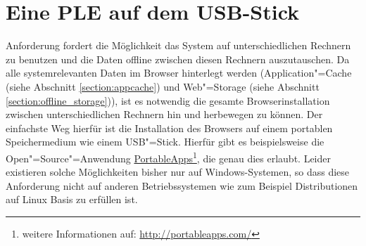\section{Eine \acs{PLE} auf dem USB-Stick}\label{section:ple_auf_usb}
Anforderung  fordert die Möglichkeit das System auf unterschiedlichen Rechnern zu benutzen und die Daten offline zwischen diesen Rechnern auszutauschen. Da alle systemrelevanten Daten im Browser hinterlegt werden (Application"=Cache (siehe Abschnitt \ref{section:appcache}) und Web"=Storage (siehe Abschnitt \ref{section:offline_storage})), ist es notwendig die gesamte Browserinstallation zwischen unterschiedlichen Rechnern hin und herbewegen zu können. Der einfachste Weg hierfür ist die Installation des Browsers auf einem portablen Speichermedium wie einem USB"=Stick. Hierfür gibt es beispielsweise die Open"=Source"=Anwendung \href{http://portableapps.com/}{PortableApps}\footnote{weitere Informationen auf: \url{http://portableapps.com/}}, die genau dies erlaubt. Leider existieren solche Möglichkeiten bisher nur auf Windows-Systemen, so dass diese Anforderung nicht auf anderen Betriebssystemen wie zum Beispiel Distributionen auf Linux Basis zu erfüllen ist. 